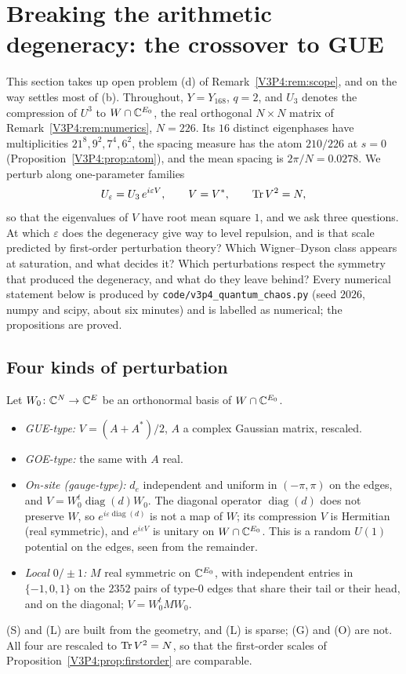 \section{Breaking the arithmetic degeneracy: the crossover to GUE}\label{V3P4:sec:chaos}

This section takes up open problem (d) of Remark~\ref{V3P4:rem:scope}, and on the way settles
most of (b). Throughout, $Y=Y_{168}$, $q=2$, and $U_3$ denotes the compression of $U^{3}$ to
$W\cap\mathbb{C}^{E_0}$, the real orthogonal $N\times N$ matrix of Remark~\ref{V3P4:rem:numerics},
$N=226$. Its $16$ distinct eigenphases have multiplicities $21^{8},9^{2},7^{4},6^{2}$, the
spacing measure has the atom $210/226$ at $s=0$ (Proposition~\ref{V3P4:prop:atom}), and the mean
spacing is $2\pi/N=0.0278$. We perturb along one-parameter families
\[
U_\varepsilon=U_3\,e^{i\varepsilon V},\qquad V=V^{*},\qquad \operatorname{Tr} V^{2}=N,
\]
so that the eigenvalues of $V$ have root mean square $1$, and we ask three questions. At which
$\varepsilon$ does the degeneracy give way to level repulsion, and is that scale predicted by
first-order perturbation theory? Which Wigner--Dyson class appears at saturation, and what decides
it? Which perturbations respect the symmetry that produced the degeneracy, and what do they
leave behind? Every numerical statement below is produced by
\texttt{code/v3p4\_quantum\_chaos.py} (seed $2026$, numpy and scipy, about six minutes) and is
labelled as numerical; the propositions are proved.

\subsection*{Four kinds of perturbation}

Let $W_0\colon\mathbb{C}^{N}\to\mathbb{C}^{E}$ be an orthonormal basis of $W\cap\mathbb{C}^{E_0}$.
\begin{itemize}
\item[(G)] \emph{GUE-type:} $V=(A+A^{*})/2$, $A$ a complex Gaussian matrix, rescaled.
\item[(O)] \emph{GOE-type:} the same with $A$ real.
\item[(S)] \emph{On-site (gauge-type):} $d_e$ independent and uniform in $(-\pi,\pi)$ on the edges,
and $V=W_0^{t}\operatorname{diag}(d)W_0$. The diagonal operator $\operatorname{diag}(d)$ does not
preserve $W$, so $e^{i\varepsilon\operatorname{diag}(d)}$ is not a map of $W$; its compression
$V$ is Hermitian (real symmetric), and $e^{i\varepsilon V}$ is unitary on $W\cap\mathbb{C}^{E_0}$. This is
a random $U(1)$ potential on the edges, seen from the remainder.
\item[(L)] \emph{Local $0/\pm1$:} $M$ real symmetric on $\mathbb{C}^{E_0}$, with independent entries in
$\{-1,0,1\}$ on the $2352$ pairs of type-$0$ edges that share their tail or their head, and on the
diagonal; $V=W_0^{t}MW_0$.
\end{itemize}
(S) and (L) are built from the geometry, and (L) is sparse; (G) and (O) are not. All four are
rescaled to $\operatorname{Tr} V^{2}=N$, so that the first-order scales of Proposition~\ref{V3P4:prop:firstorder}
are comparable.

